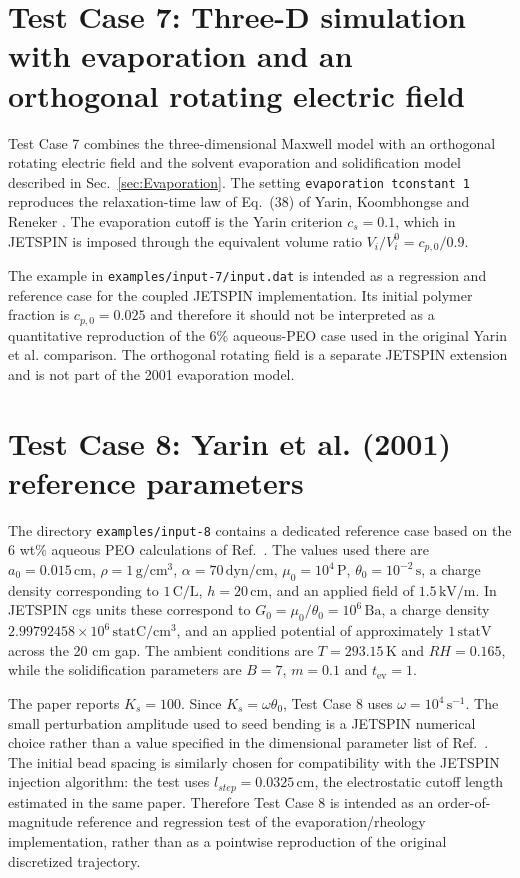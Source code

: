 
\section{Test Case 7: Three-D simulation with evaporation and an orthogonal rotating electric field}

Test Case 7 combines the three-dimensional Maxwell model with an
orthogonal rotating electric field and the solvent evaporation and
solidification model described in Sec.~\ref{sec:Evaporation}. The
setting \texttt{evaporation tconstant 1} reproduces the relaxation-time
law of Eq.~(38) of Yarin, Koombhongse and Reneker
\cite{yarin2001bending}. The evaporation cutoff is the Yarin criterion
$c_s=0.1$, which in JETSPIN is imposed through the equivalent volume
ratio $V_i/V_i^0=c_{p,0}/0.9$.

The example in \texttt{examples/input-7/input.dat} is intended as a
regression and reference case for the coupled JETSPIN implementation.
Its initial polymer fraction is $c_{p,0}=0.025$ and therefore it should
not be interpreted as a quantitative reproduction of the 6\% aqueous-PEO
case used in the original Yarin et al. comparison. The orthogonal rotating
field is a separate JETSPIN extension and is not part of the 2001
evaporation model.

\section{Test Case 8: Yarin et al. (2001) reference parameters\label{sec:Test-Case-8}}

The directory \texttt{examples/input-8} contains a dedicated reference
case based on the 6 wt\% aqueous PEO calculations of
Ref.~\cite{yarin2001bending}. The values used there are
$a_0=0.015\,\mathrm{cm}$, $\rho=1\,\mathrm{g/cm^3}$,
$\alpha=70\,\mathrm{dyn/cm}$, $\mu_0=10^4\,\mathrm{P}$,
$\theta_0=10^{-2}\,\mathrm{s}$, a charge density corresponding to
$1\,\mathrm{C/L}$, $h=20\,\mathrm{cm}$, and an applied field of
$1.5\,\mathrm{kV/m}$. In JETSPIN cgs units these correspond to
$G_0=\mu_0/\theta_0=10^6\,\mathrm{Ba}$, a charge density
$2.99792458\times10^6\,\mathrm{statC/cm^3}$, and an applied potential
of approximately $1\,\mathrm{statV}$ across the 20 cm gap. The ambient
conditions are $T=293.15\,\mathrm{K}$ and $RH=0.165$, while the
solidification parameters are $B=7$, $m=0.1$ and
$t_{\mathrm{ev}}=1$.

The paper reports $K_s=100$. Since $K_s=\omega\theta_0$, Test Case 8
uses $\omega=10^4\,\mathrm{s^{-1}}$. The small perturbation amplitude
used to seed bending is a JETSPIN numerical choice rather than a value
specified in the dimensional parameter list of Ref.~\cite{yarin2001bending}.
The initial bead spacing is similarly chosen for compatibility with the
JETSPIN injection algorithm: the test uses $l_{step}=0.0325\,\mathrm{cm}$,
the electrostatic cutoff length estimated in the same paper. Therefore
Test Case 8 is intended as an order-of-magnitude reference and regression
test of the evaporation/rheology implementation, rather than as a pointwise
reproduction of the original discretized trajectory.

